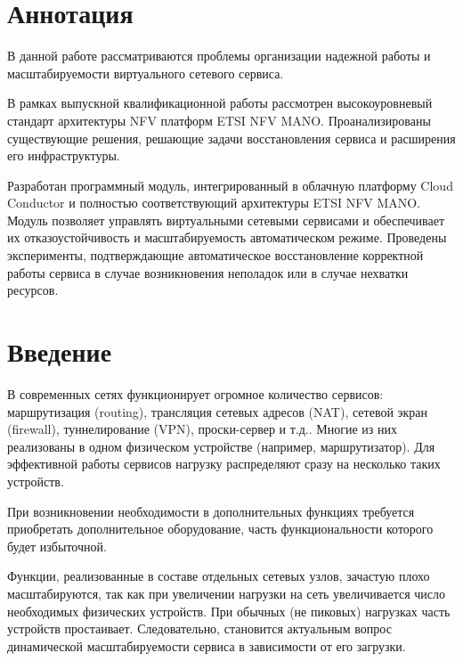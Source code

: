 \documentclass[oneside,final,14pt,a4paper]{extreport}
\begin{document}
\chapter*{Аннотация}
В данной работе рассматриваются проблемы организации надежной работы и масштабируемости виртуального сетевого сервиса.

В рамках выпускной квалификационной работы рассмотрен высокоуровневый стандарт архитектуры NFV платформ ETSI NFV MANO. Проанализированы существующие решения, решающие задачи восстановления сервиса и расширения его инфраструктуры.

Разработан программный модуль, интегрированный в облачную платформу Cloud Conductor и полностью соответствующий архитектуры ETSI NFV MANO. Модуль позволяет управлять виртуальными сетевыми сервисами и обеспечивает их отказоустойчивость и масштабируемость автоматическом режиме. Проведены эксперименты, подтверждающие автоматическое восстановление корректной работы сервиса в случае возникновения неполадок или в случае нехватки ресурсов.





\tableofcontents %





\chapter*{Введение}

В современных сетях функционирует огромное количество сервисов: маршрутизация (routing), трансляция сетевых адресов (NAT), сетевой экран (firewall), туннелирование (VPN), проски-сервер и т.д.. Многие из них реализованы в одном физическом устройстве (например, маршрутизатор). Для эффективной работы сервисов нагрузку распределяют сразу на несколько таких устройств. 

При возникновении необходимости в дополнительных функциях требуется приобретать дополнительное оборудование, часть функциональности которого будет избыточной. 

Функции, реализованные в составе отдельных сетевых узлов, зачастую плохо масштабируются, так как при увеличении нагрузки на сеть увеличивается число необходимых физических устройств. При обычных (не пиковых) нагрузках часть устройств простаивает. Следовательно, становится актуальным вопрос динамической масштабируемости сервиса в зависимости от его загрузки.
\end{document}
